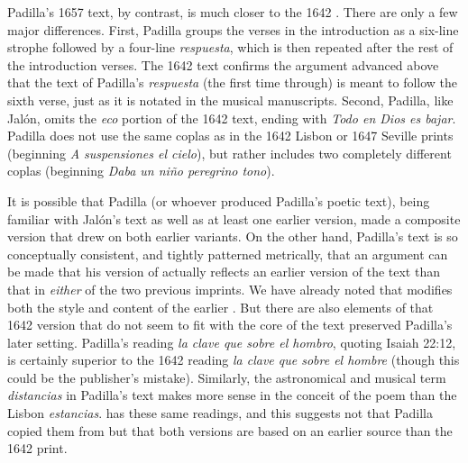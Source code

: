 Padilla's 1657 text, by contrast, is much closer to the 1642 .
There are only a few major differences.
First, Padilla groups the verses in the introduction as a six-line strophe
followed by a four-line \emph{respuesta}, which is then repeated after the rest of
the introduction verses. 
The 1642 text confirms the argument advanced above that the text of Padilla's
\emph{respuesta} (the first time through) is meant to follow the sixth verse, just as
it is notated in the musical manuscripts.
Second, Padilla, like Jalón, omits the \emph{eco} portion of the 1642 text, ending
with \emph{Todo en Dios es bajar}. 
Padilla does not use the same coplas as in the 1642 Lisbon or 1647 Seville
prints (beginning \emph{A suspensiones el cielo}), but rather includes two
completely different coplas (beginning \emph{Daba un niño peregrino tono}).

It is possible that Padilla (or whoever produced Padilla's poetic text), being
familiar with Jalón's text as well as at least one earlier version, made a
composite version that drew on both earlier variants.
On the other hand, Padilla's text is so conceptually consistent, and tightly
patterned metrically, that an argument can be made that his version of 
actually reflects an earlier version of the text than that in \emph{either} of the
two previous imprints.
We have already noted that  modifies both the style and content of the
earlier .
But there are also elements of that 1642 version that do not seem to fit with
the core of the text preserved Padilla's later setting.
Padilla's reading \emph{la clave que sobre el hombro}, quoting Isaiah 22:12, is
certainly superior to the 1642 reading \emph{la clave que sobre el hombre} (though
this could be the publisher's mistake).
Similarly, the astronomical and musical term \emph{distancias} in Padilla's text
makes more sense in the conceit of the poem than the Lisbon \emph{estancias}.
 has these same readings, and this suggests not that Padilla copied them
from  but that both versions are based on an earlier source than the
1642 print.

